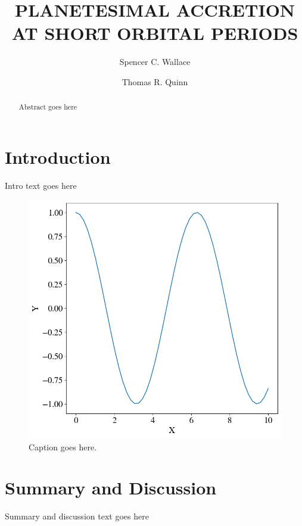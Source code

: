 \documentclass[twocolumn]{aastex63}
\begin{document}
\title{PLANETESIMAL ACCRETION AT SHORT ORBITAL PERIODS}

\author{Spencer C. Wallace}


\author{Thomas R. Quinn}

\begin{abstract}
Abstract goes here
\end{abstract}

\section{Introduction} \label{sec:intro}

Intro text goes here \citep{2019MNRAS.489.2159W}

\begin{figure}
    \includegraphics[width=\columnwidth]{figures/test.png}
    \caption{Caption goes here.\label{fig:test}}
\end{figure}

\section{Summary and Discussion} \label{sec:discuss}

Summary and discussion text goes here



\clearpage
\end{document}
